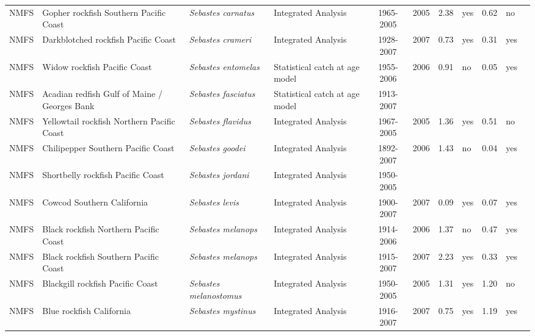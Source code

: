 \begin{longtable}{p{1.8cm}p{3.5cm}p{3.5cm}p{3cm}cccp{0.9cm}cp{0.9cm}c}
  NMFS & Gopher rockfish Southern Pacific Coast & \textit{Sebastes carnatus} & Integrated Analysis & 1965-2005 & 2005 & 2.38 & yes & 0.62 & no & \cite{2005-SAFE-Wcgopher.pdf} \\ 
  NMFS & Darkblotched rockfish Pacific Coast & \textit{Sebastes crameri} & Integrated Analysis & 1928-2007 & 2007 & 0.73 & yes & 0.31 & yes & \cite{NWFSC-DKROCKPCOAST-2008-Darkblotched rockfish.pdf} \\ 
  NMFS & Widow rockfish Pacific Coast & \textit{Sebastes entomelas} & Statistical catch at age model & 1955-2006 & 2006 & 0.91 & no & 0.05 & yes & \cite{NWFSC-WROCKPCOAST-2007-widow.pdf} \\ 
  NMFS & Acadian redfish Gulf of Maine / Georges Bank & \textit{Sebastes fasciatus} & Statistical catch at age model & 1913-2007 &  &  &  &  &  & \cite{AcadianRedfish2008.pdf} \\ 
  NMFS & Yellowtail rockfish Northern Pacific Coast & \textit{Sebastes flavidus} & Integrated Analysis & 1967-2005 & 2005 & 1.36 & yes & 0.51 & no & \cite{2005_SAFE_yellowtail.pdf} \\ 
  NMFS & Chilipepper Southern Pacific Coast & \textit{Sebastes goodei} & Integrated Analysis & 1892-2007 & 2006 & 1.43 & no & 0.04 & yes & \cite{NWFSC-CHILISPCOAST-2007-Chilipepper CA OR.pdf} \\ 
  NMFS & Shortbelly rockfish Pacific Coast & \textit{Sebastes jordani} & Integrated Analysis & 1950-2005 &  &  &  &  &  & \cite{SWFSC-SBELLYROCKPCOAST-2007-Shortbelly rockfish.pdf} \\ 
  NMFS & Cowcod Southern California & \textit{Sebastes levis} & Integrated Analysis & 1900-2007 & 2007 & 0.09 & yes & 0.07 & yes & \cite{NWFSC-COWCODSCAL-2007-Cowcod CA.pdf} \\ 
  NMFS & Black rockfish Northern Pacific Coast & \textit{Sebastes melanops} & Integrated Analysis & 1914-2006 & 2006 & 1.37 & no & 0.47 & yes & \cite{NWFSC-BLACKROCKNPCOAST-2007-Black rockfish NOR WA.pdf} \\ 
  NMFS & Black rockfish Southern Pacific Coast & \textit{Sebastes melanops} & Integrated Analysis & 1915-2007 & 2007 & 2.23 & yes & 0.33 & yes & \cite{NWFSC-BLACKROCKSPCOAST-2007-Black rockfish OR CA.pdf} \\ 
  NMFS & Blackgill rockfish  Pacific Coast & \textit{Sebastes melanostomus} & Integrated Analysis & 1950-2005 & 2005 & 1.31 & yes & 1.20 & no & \cite{2005-SAFE-Wcblackgill.pdf} \\ 
  NMFS & Blue rockfish California & \textit{Sebastes mystinus} & Integrated Analysis & 1916-2007 & 2007 & 0.75 & yes & 1.19 & yes & \cite{NWFSC-BLUEROCKCAL-2007-Blue rockfish CA.pdf} \\ 

\end{longtable}

